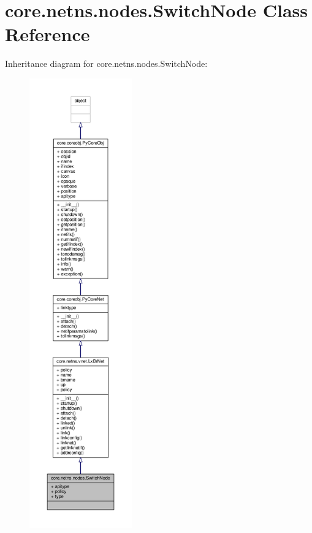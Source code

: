 \hypertarget{classcore_1_1netns_1_1nodes_1_1_switch_node}{\section{core.\+netns.\+nodes.\+Switch\+Node Class Reference}
\label{classcore_1_1netns_1_1nodes_1_1_switch_node}
}


Inheritance diagram for core.\+netns.\+nodes.\+Switch\+Node\+:
\nopagebreak
\begin{figure}[H]
\begin{center}
\leavevmode
\includegraphics[height=550pt]{classcore_1_1netns_1_1nodes_1_1_switch_node__inherit__graph}
\end{center}
\end{figure}


